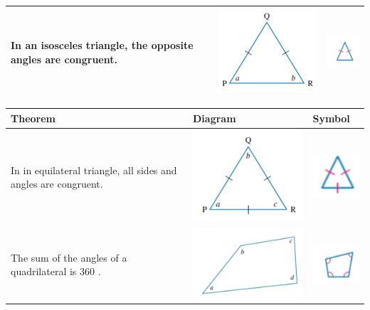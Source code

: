 \documentclass{book}
\begin{document}
\begin{center}
\begin{tabular}{|p{5cm}|p{6cm}|p{2cm}|}
		In an isosceles triangle, the opposite angles are congruent.                              & \includegraphics[width=6cm]{geometry theorem 7} & \includegraphics[width=2cm]{geometry theorem 7 symbol} \\ \hline
	\end{tabular}
	\begin{tabular}{|p{5cm}|p{6cm}|p{2cm}|}
		\hline
		Theorem                                                         & Diagram                                          & Symbol                                                  \\ \hline
		In in equilateral triangle, all sides and angles are congruent. & \includegraphics[width=6cm]{geometry theorem 8}  & \includegraphics[width=2cm]{geometry theorem 8 symbol}  \\ \hline
		The sum of the angles of a quadrilateral is 360 \degree.        & \includegraphics[width=6cm]{geometry theorem 9}  & \includegraphics[width=2cm]{geometry theorem 9 symbol}  \\ \hline

\end{tabular}
\end{center}
\end{document}
